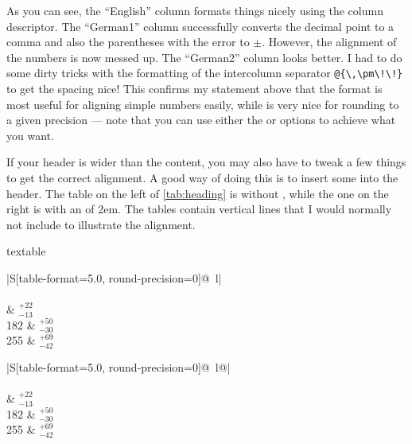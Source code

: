 As you can see, the \enquote{English} column formats things nicely using
the  column descriptor. The \enquote{German1} column successfully
converts the decimal point to a comma and also the parentheses with
the error to \(\pm\). However, the alignment of the numbers is now
messed up. The \enquote{German2} column looks better. I had to do some dirty
tricks with the formatting of the intercolumn separator
\verb+@{\,\pm\!\!}+ to get the spacing nice! This confirms my
statement above that the  format is most useful for aligning
simple numbers easily, while  is very nice for rounding to
a given precision --- note that you can use either the  or
 options to achieve what you want.

If your header is wider than the content,
you may also have to tweak a few things to get the correct alignment.
A good way of doing this is to insert some  into the header.
The table on the left of \cref{tab:heading} is without , while the one on the right is
with an  of 2em.
The tables contain vertical lines that I would normally not include to illustrate the alignment.

\begin{table}[htbp]
\begin{tcblisting}{textable}
\caption{Table illustrating how to centre numbers
  if the heading is wider than them.}%
\label{tab:heading}
\renewcommand{\arraystretch}{1.4}
\centering
\begin{tabular}{|S[table-format=5.0, round-precision=0]@{\,} l|}
  \toprule
   \\
   \\
   & \(^{+22}_{-13}\) \\
    182 & \(^{+50}_{-30}\) \\
    255 & \(^{+69}_{-42}\) \\
  \bottomrule
\end{tabular}
\qquad
\begin{tabular}{|S[table-format=5.0, round-precision=0]@{\,}
  l@{\hspace*{2em}}|}
  \toprule
   \\
   \\
   & \(^{+22}_{-13}\) \\
    182 & \(^{+50}_{-30}\) \\
    255 & \(^{+69}_{-42}\) \\
  \bottomrule
\end{tabular}
\end{tcblisting}
\end{table}


